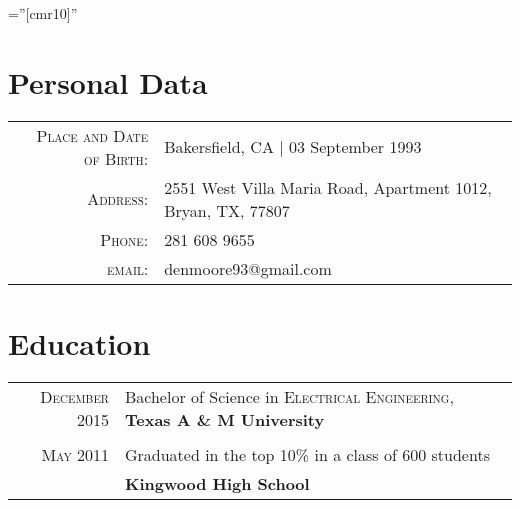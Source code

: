 \documentclass[a4paper,10pt]{article} %
\begin{document}
\pagestyle{empty} %

\font\fb=''[cmr10]'' %


\par{\bigskip\par} %

\section{Personal Data}

\begin{tabular}{rl}
\textsc{Place and Date of Birth:} & Bakersfield, CA  | 03 September 1993 \\
\textsc{Address:} & 2551 West Villa Maria Road, Apartment 1012, Bryan, TX, 77807 \\
\textsc{Phone:} & 281 608 9655\\
\textsc{email:} & denmoore93@gmail.com
\end{tabular}



\section{Education}

\begin{tabular}{rl}	
\textsc{December} 2015 & Bachelor of Science in \textsc{Electrical Engineering}, \textbf{Texas A \& M University}\\

&\\


\textsc{May} 2011& Graduated in the top 10\% in a class of 600 students\\
& \textbf{Kingwood High School}\\

\end{tabular}
\end{document}
